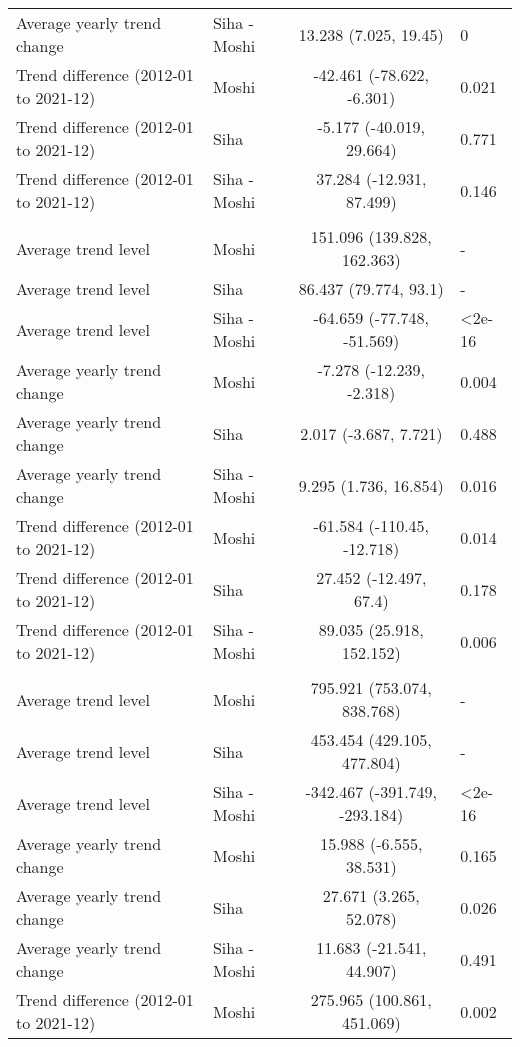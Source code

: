 \begin{longtable}{l|lcl}
Average yearly trend change & Siha - Moshi & 13.238 (7.025, 19.45) & 0 \\ 
Trend difference (2012-01 to 2021-12) & Moshi & -42.461 (-78.622, -6.301) & 0.021 \\ 
Trend difference (2012-01 to 2021-12) & Siha & -5.177 (-40.019, 29.664) & 0.771 \\ 
Trend difference (2012-01 to 2021-12) & Siha - Moshi & 37.284 (-12.931, 87.499) & 0.146 \\ 
\midrule\addlinespace[2.5pt]
\multicolumn{4}{l}{Fractures} \\ 
\midrule\addlinespace[2.5pt]
Average trend level & Moshi & 151.096 (139.828, 162.363) & - \\ 
Average trend level & Siha & 86.437 (79.774, 93.1) & - \\ 
Average trend level & Siha - Moshi & -64.659 (-77.748, -51.569) & <2e-16 \\ 
Average yearly trend change & Moshi & -7.278 (-12.239, -2.318) & 0.004 \\ 
Average yearly trend change & Siha & 2.017 (-3.687, 7.721) & 0.488 \\ 
Average yearly trend change & Siha - Moshi & 9.295 (1.736, 16.854) & 0.016 \\ 
Trend difference (2012-01 to 2021-12) & Moshi & -61.584 (-110.45, -12.718) & 0.014 \\ 
Trend difference (2012-01 to 2021-12) & Siha & 27.452 (-12.497, 67.4) & 0.178 \\ 
Trend difference (2012-01 to 2021-12) & Siha - Moshi & 89.035 (25.918, 152.152) & 0.006 \\ 
\midrule\addlinespace[2.5pt]
\multicolumn{4}{l}{Hypertension} \\ 
\midrule\addlinespace[2.5pt]
Average trend level & Moshi & 795.921 (753.074, 838.768) & - \\ 
Average trend level & Siha & 453.454 (429.105, 477.804) & - \\ 
Average trend level & Siha - Moshi & -342.467 (-391.749, -293.184) & <2e-16 \\ 
Average yearly trend change & Moshi & 15.988 (-6.555, 38.531) & 0.165 \\ 
Average yearly trend change & Siha & 27.671 (3.265, 52.078) & 0.026 \\ 
Average yearly trend change & Siha - Moshi & 11.683 (-21.541, 44.907) & 0.491 \\ 
Trend difference (2012-01 to 2021-12) & Moshi & 275.965 (100.861, 451.069) & 0.002 \\ 

\end{longtable}
